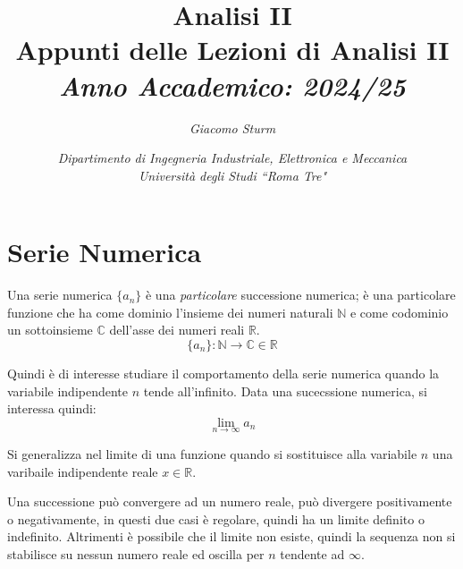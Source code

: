 \documentclass{article}
\numberwithin{equation}{subsection}
\begin{document}
\title{%
    \textbf{Analisi II}  \\ 
    \large Appunti delle Lezioni di Analisi II \\
    \textit{Anno Accademico: 2024/25}}
\author{\textit{Giacomo Sturm}}
\date{\textit{Dipartimento di Ingegneria Industriale, Elettronica e Meccanica \\
Università degli Studi ``Roma Tre"}} 

\maketitle
\thispagestyle{link}

\clearpage


\pagestyle{fancy}
\fancyhead{}\fancyfoot{}
\fancyfoot[C]{\thepage}

\tableofcontents

\clearpage
{}

\section{Serie Numerica}

Una serie numerica $\{a_n\}$ è una \textit{particolare} successione numerica; 
è una particolare funzione che ha come dominio l'insieme dei numeri naturali $\mathbb{N}$ e come codominio un sottoinsieme $\mathbb{C}$ dell'asse dei numeri reali $\mathbb{R}$. 
\begin{equation}
    \{a_n\}:\mathbb{N}\rightarrow\mathbb{C}\in\mathbb{R}
\end{equation}

Quindi è di interesse studiare il comportamento della serie numerica quando la variabile indipendente $n$ tende all'infinito. Data una sucecssione numerica, si interessa quindi:
\begin{equation}
    \lim_{n\to\infty}a_n
\end{equation}

Si generalizza nel limite di una funzione quando si sostituisce alla variabile $n$ una varibaile indipendente reale $x\in\mathbb{R}$. 

Una successione può convergere ad un numero reale, può divergere positivamente o negativamente, in questi due casi è regolare, quindi ha un limite definito o indefinito. Altrimenti è possibile che il limite non esiste, quindi la sequenza non si stabilisce su nessun numero reale ed oscilla per $n$ tendente ad $\infty$. 
\end{document}
